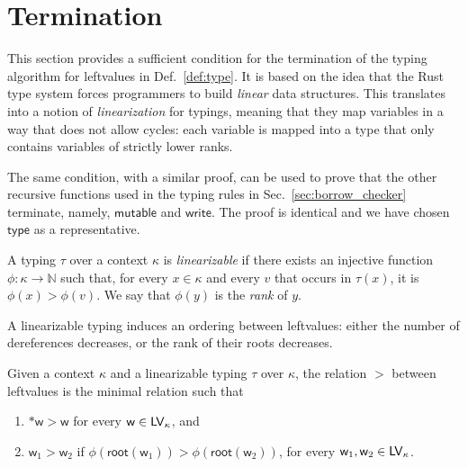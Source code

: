 \section{Termination}\label{sec:termination}

This section provides a sufficient condition for the termination of the
typing algorithm for leftvalues in Def.~\ref{def:type}. It is based on the
idea that the Rust type system forces programmers to build
\emph{linear} data structures. This translates into a notion of
\emph{linearization} for typings, meaning that they map
variables in a way that does not allow cycles: each variable is mapped
into a type that only contains variables of strictly lower ranks.

The same condition, with a similar proof, can be used to prove that
the other recursive functions used in the typing rules in Sec.~\ref{sec:borrow_checker}
terminate, namely, $\mathsf{mutable}$ and $\mathsf{write}$.
The proof is identical and we have chosen $\mathsf{type}$ as a representative.

\begin{definition}\label{def:linearization}
  A typing $\tau$ over a context $\kappa$ is \emph{linearizable} if there exists
  an injective function $\phi:\kappa\to\mathbb{N}$ such that, for every $x\in\kappa$ and every
  $v$ that occurs in $\tau(x)$, it is $\phi(x)>\phi(v)$. We say that $\phi(y)$ is the \emph{rank} of $y$.
\end{definition}

A linearizable typing induces an ordering between leftvalues: either
the number of dereferences decreases, or the rank of their roots decreases.

\begin{definition}\label{def:ordering}
  Given a context $\kappa$ and a linearizable typing $\tau$ over $\kappa$, the
  relation $>$ between leftvalues is the minimal relation such that
  \begin{enumerate}
  \item $\mathtt{*}\mathsf{w}>\mathsf{w}$ for every $\mathsf{w}\in\mathsf{LV}_\kappa$, and
  \item $\mathsf{w}_1>\mathsf{w}_2$ if
    $\phi(\mathsf{root}(\mathsf{w}_1))>\phi(\mathsf{root}(\mathsf{w}_2))$,
    for every $\mathsf{w}_1,\mathsf{w}_2\in\mathsf{LV}_\kappa$.
  \end{enumerate}
\end{definition}

